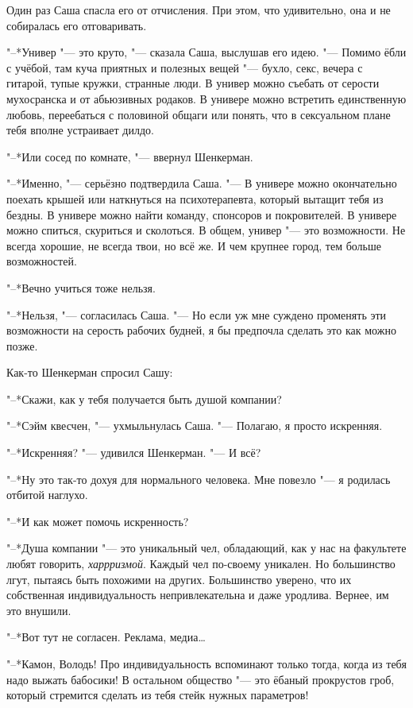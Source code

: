 Один раз Саша спасла его от отчисления.
При этом, что удивительно, она и не собиралась его отговаривать.

"--*Универ "--- это круто, "--- сказала Саша, выслушав его идею.
"--- Помимо ёбли с учёбой, там куча приятных и полезных вещей "--- бухло, секс, вечера с гитарой, тупые кружки, странные люди.
В универ можно съебать от серости мухосранска и от абьюзивных родаков.
В универе можно встретить единственную любовь, переебаться с половиной общаги или понять, что в сексуальном плане тебя вполне устраивает дилдо.

"--*Или сосед по комнате, "--- ввернул Шенкерман.

"--*Именно, "--- серьёзно подтвердила Саша.
"--- В универе можно окончательно поехать крышей или наткнуться на психотерапевта, который вытащит тебя из бездны.
В универе можно найти команду, спонсоров и покровителей.
В универе можно спиться, скуриться и сколоться.
В общем, универ "--- это возможности.
Не всегда хорошие, не всегда твои, но всё же.
И чем крупнее город, тем больше возможностей.

"--*Вечно учиться тоже нельзя.

"--*Нельзя, "--- согласилась Саша.
"--- Но если уж мне суждено променять эти возможности на серость рабочих будней, я бы предпочла сделать это как можно позже.

Как-то Шенкерман спросил Сашу:

"--*Скажи, как у тебя получается быть душой компании?

"--*Сэйм квесчен, "--- ухмыльнулась Саша.
"--- Полагаю, я просто искренняя.

"--*Искренняя? "--- удивился Шенкерман.
"--- И всё?

"--*Ну это так-то дохуя для нормального человека.
Мне повезло "--- я родилась отбитой наглухо.

"--*И как может помочь искренность?

"--*Душа компании "--- это уникальный чел, обладающий, как у нас на факультете любят говорить, \emph{харрризмой}.
Каждый чел по-своему уникален.
Но большинство лгут, пытаясь быть похожими на других.
Большинство уверено, что их собственная индивидуальность непривлекательна и даже уродлива.
Вернее, им это внушили.

"--*Вот тут не согласен.
Реклама, медиа\ldots{}

"--*Камон, Володь!
Про индивидуальность вспоминают только тогда, когда из тебя надо выжать бабосики!
В остальном общество "--- это ёбаный прокрустов гроб, который стремится сделать из тебя стейк нужных параметров!

